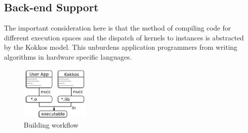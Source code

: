 \subsection{Back-end Support}\label{chap:kokkosBackend}


The important consideration here is that the method of compiling code for different execution spaces and the dispatch of kernels to instances is abstracted by the Kokkos model. This unburdens application programmers from writing algorithms in hardware specific languages.



\begin{figure}
\centerline{\includegraphics[width=0.3\textwidth]{img/Build.png}}
\caption{Building workflow}
\label{fig}
\end{figure}